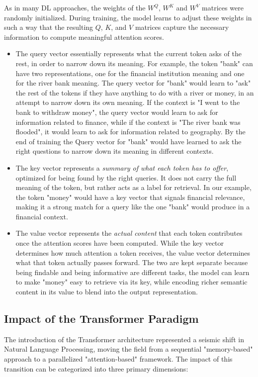 \documentclass[a4paper,12pt]{article}
\begin{document}
As in many DL approaches, the weights of the $W^Q$, $W^K$ and $W^V$ matrices were randomly initialized. During training, the model learns to adjust these weights in such a way that the resulting $Q$, $K$, and $V$ matrices capture the necessary information to compute meaningful attention scores.

\begin{itemize}
    \item [$Q$:] The query vector essentially represents what the current token asks of the rest, in order to narrow down its meaning. For example, the token "bank" can have two representations, one for the financial institution meaning and one for the river bank meaning. The query vector for "bank" would learn to "ask" the rest of the tokens if they have anything to do with a river or money, in an attempt to narrow down its own meaning. If the context is "I went to the bank to withdraw money", the query vector would learn to ask for information related to finance, while if the context is "The river bank was flooded", it would learn to ask for information related to geography. By the end of training the Query vector for "bank" would have learned to ask the right questions to narrow down its meaning in different contexts.
    
    \item[$K$:] The key vector represents a \textit{summary of what each token has to offer}, optimized for being found by the right queries. It does not carry the full meaning of the token, but rather acts as a label for retrieval. In our example, the token "money" would have a key vector that signals financial relevance, making it a strong match for a query like the one "bank" would produce in a financial context.

    \item[$V$:] The value vector represents the \textit{actual content} that each token contributes once the attention scores have been computed. While the key vector determines how much attention a token receives, the value vector determines what that token actually passes forward. The two are kept separate because being findable and being informative are different tasks, the model can learn to make "money" easy to retrieve via its key, while encoding richer semantic content in its value to blend into the output representation.

\end{itemize}

\subsection{Impact of the Transformer Paradigm}
The introduction of the Transformer architecture represented a seismic shift in Natural Language Processing, moving the field from a sequential "memory-based" approach to a parallelized "attention-based" framework. The impact of this transition can be categorized into three primary dimensions:
\end{document}

